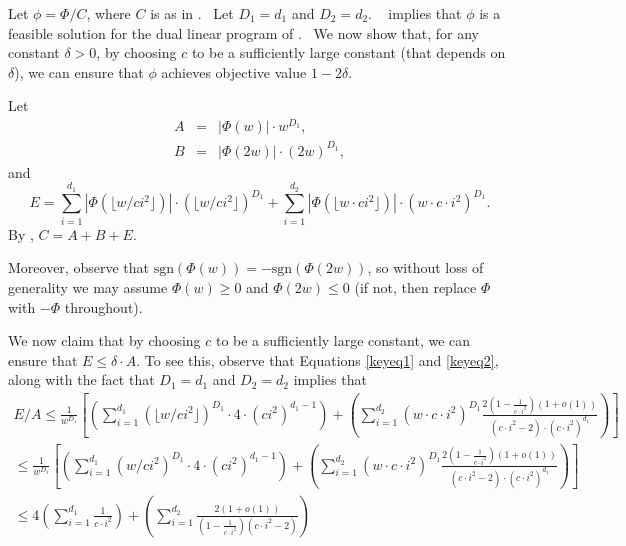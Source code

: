 \documentclass[10pt,a4paper]{article}
\newcommand{\<}{\langle}
\renewcommand{\>}{\rangle}
\begin{document}
Let $\phi =\Phi /C$, where $C$ is as in . \ Let $
D_{1}=d_{1}$ and $D_{2}=d_{2}$. \  implies that $\phi $ is a
feasible solution for the dual linear program of . \ We now
show that, for any constant $\delta >0$, by choosing $c$ to be a
sufficiently large constant (that depends on $\delta $), we can ensure
that $\phi $ achieves objective value $1-2\delta $.

Let
\begin{eqnarray*}
A &=&|\Phi (w)|\cdot w^{D_{1}}, \\
B &=&|\Phi (2w)|\cdot (2w)^{D_{1}},
\end{eqnarray*}
and
\begin{equation*}
E=\sum_{i=1}^{d_{1}}|\Phi (\lfloor w/ci^{2}\rfloor )|\cdot \left( \lfloor
w/ci^{2}\rfloor \right) ^{D_{1}}+\sum_{i=1}^{d_{2}}|\Phi (\lfloor w\cdot
ci^{2}\rfloor )|\cdot \left( w\cdot c\cdot i^{2}\right) ^{D_{1}}.
\end{equation*}
By , $C=A+B+E$.

Moreover, observe that $\text{sgn}(\Phi(w)) = - \text{sgn}(\Phi(2w))$, so
without loss of generality we may assume $\Phi(w) \geq 0$ and $\Phi(2w) \leq
0$ (if not, then replace $\Phi$ with $-\Phi$ throughout).

We now claim that by choosing $c$ to be a sufficiently large constant, we
can ensure that $E \leq \delta \cdot A$. To see this, observe that
Equations \eqref{keyeq1} and \eqref{keyeq2}, along with the fact that $
D_1=d_1$ and $D_2=d_2$ implies that
\begin{align*}
E/A \leq \frac{1}{w^{D_1}} \left[ \left(\sum_{i=1}^{d_1} \left(\lfloor
w/ci^2\rfloor\right)^{D_1}\cdot 4 \cdot \left(ci^2\right)^{d_1-1} \right) +
\left(\sum_{i=1}^{d_2} \left(w \cdot c \cdot i^2\right)^{D_1} \frac{2
\left(1-\frac{1}{c \cdot i^2}\right)\left(1+o(1)\right)}{(c \cdot i^2 - 2)
\cdot (c\cdot i^2)^{d_1}}\right)\right] \\
\leq \frac{1}{w^{D_1}} \left[ \left(\sum_{i=1}^{d_1}
\left(w/ci^2\right)^{D_1} \cdot 4 \cdot \left(ci^2\right)^{d_1-1} \right) +
\left(\sum_{i=1}^{d_2} \left(w \cdot c \cdot i^2\right)^{D_1} \frac{2
\left(1-\frac{1}{c \cdot i^2}\right)\left(1+o(1)\right)}{(c \cdot i^2 - 2)
\cdot (c\cdot i^2)^{d_1}}\right) \right] \\
\leq 4 \left(\sum_{i=1}^{d_1} \frac{1}{c\cdot i^2}\right) +
\left(\sum_{i=1}^{d_2} \frac{2 \left(1+o(1)\right)}{\left(1-\frac{1}{c \cdot
i^2}\right) \left(c \cdot i^2 - 2\right)}\right) \\
\end{align*}
\end{document}
